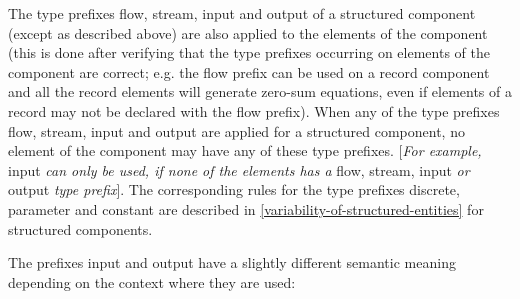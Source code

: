 \documentclass[10pt,a4paper]{report}
\begin{document}
The type prefixes flow, stream, input and output of a structured
component (except as described above) are also applied to the elements
of the component (this is done after verifying that the type prefixes
occurring on elements of the component are correct; e.g. the flow prefix
can be used on a record component and all the record elements will
generate zero-sum equations, even if elements of a record may not be
declared with the flow prefix). When any of the type prefixes flow,
stream, input and output are applied for a structured component, no
element of the component may have any of these type prefixes.
{[}\emph{For example,} input \emph{can only be used, if none of the
elements has a} flow, stream, input \emph{or} output \emph{type
prefix}{]}. The corresponding rules for the type prefixes discrete,
parameter and constant are described in \ref{variability-of-structured-entities} for structured
components.

The prefixes input and output have a slightly different semantic meaning
depending on the context where they are used:
\end{document}
